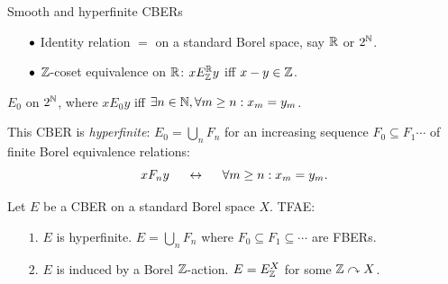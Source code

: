 \documentclass{beamer}
\begin{document}
    \begin{frame}{Smooth and hyperfinite CBERs}
        \vspace{-0.1in}
        \begin{example}[Smooth]
            \begin{itemize}
                \item[\scriptsize$\bullet$] Identity relation $=$ on a standard Borel space, say $\mathbb{R}$ or $2^{\mathbb{N}}$.
                    \pause
                \item[\scriptsize$\bullet$] $\mathbb{Z}$-coset equivalence on $\mathbb{R}$: $xE^{\mathbb{R}}_{\mathbb{Z}} y$ iff $x-y\in\mathbb{Z}$.
            \end{itemize}
        \end{example}

        \pause
        \vspace{-0.1in}

        \begin{example}[Hyperfinite]
            $E_0$ on $2^{\mathbb{N}}$, where $xE_0y$ iff $\exists n\in\mathbb{N},\forall m\geq n:x_m=y_m$.
        \end{example}

        \pause

        This CBER is \textit{hyperfinite}: $E_0=\bigcup_nF_n$ for an increasing sequence $F_0\subseteq F_1\cdots$ of finite Borel equivalence relations:
        \pause
        \vspace{-0.1in}
        \begin{equation*}
            xF_ny\ \ \ \ \leftrightarrow\ \ \ \ \forall m\geq n:x_m=y_m.
        \end{equation*}

        \pause
        \vspace{-0.15in}

        \begin{theorem}
            Let $E$ be a CBER on a standard Borel space $X$. TFAE:
            \begin{itemize}
                \item[$1.$] $E$ is hyperfinite. {\color{gray}\footnotesize $E=\bigcup_nF_n$ where $F_0\subseteq F_1\subseteq\cdots$ are FBERs.}
                \item[$2.$] $E$ is induced by a Borel $\mathbb{Z}$-action. {\color{gray}\footnotesize $E=E_{\mathbb{Z}}^X$ for some $\mathbb{Z}\curvearrowright X$.}
            \end{itemize}
        \end{theorem}
    \end{frame}
\end{document}
